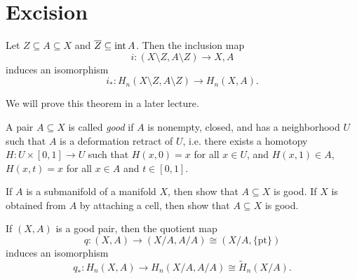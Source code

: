 \section{Excision}

\begin{theorem}[Excision]
  Let $Z \subseteq A \subseteq X$ and
  $\overline{Z} \subseteq \operatorname{int} A$. Then the
  inclusion map
  \[
    i : (X \setminus Z, A \setminus Z) \to X, A
  \]
  induces an isomorphism
  \[
    i_* : H_n(X \setminus Z, A \setminus Z) \to H_n(X, A).
  \]
\end{theorem}

\begin{remark}
  We will prove this theorem in a later lecture.
\end{remark}

\begin{definition}
  A pair $A \subseteq X$ is called
  \emph{good} if $A$ is nonempty, closed, and has
  a neighborhood $U$ such that
  $A$ is a deformation retract of $U$, i.e.
  there exists a homotopy $H : U \times [0, 1] \to U$
  such that $H(x, 0) = x$ for all $x \in U$, and
  $H(x, 1) \in A$,
  $H(x, t) = x$ for all $x \in A$ and $t \in [0, 1]$.
\end{definition}

\begin{exercise}
  If $A$ is a submanifold of a manifold $X$, then
  show that $A \subseteq X$ is good.
  If $X$ is obtained from $A$ by attaching a cell,
  then show that $A \subseteq X$ is good.
\end{exercise}

\begin{theorem}
  If $(X, A)$ is a good pair, then
  the quotient map
  \[q : (X, A) \to (X/A, A/A) \cong (X / A, \{\mathrm{pt}\})\]
  induces an isomorphism
  \[q_* : H_n(X, A) \to H_n(X/A, A/A) \cong \widetilde{H}_n(X / A).\]
\end{theorem}

